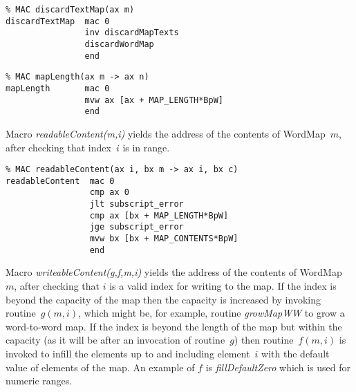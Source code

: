 {\small
\begin{verbatim}
% MAC discardTextMap(ax m)
discardTextMap  mac 0
                inv discardMapTexts
                discardWordMap
                end
\end{verbatim}}

\begin{tabbing}
\indents
{}
\end{tabbing}
\vspace{-17pt}

{\small
\begin{verbatim}
% MAC mapLength(ax m -> ax n)
mapLength       mac 0
                mvw ax [ax + MAP_LENGTH*BpW]
                end
\end{verbatim}}

Macro \emph{readableContent(m,i)} yields the address of the contents of WordMap~$m$, after checking that index~$i$ is in range.
\begin{tabbing}
\indents
{}
\fin
\end{tabbing}

{\small
\begin{verbatim}
% MAC readableContent(ax i, bx m -> ax i, bx c)
readableContent  mac 0
                 cmp ax 0
                 jlt subscript_error
                 cmp ax [bx + MAP_LENGTH*BpW]
                 jge subscript_error
                 mvw bx [bx + MAP_CONTENTS*BpW]
                 end
\end{verbatim}}

Macro \emph{writeableContent(g,f,m,i)} yields the address of the contents of WordMap~$m$, after checking that $i$ is a valid index for writing to the map. If the index is beyond the capacity of the map then the capacity is increased by invoking routine~$g(m,i)$, which might be, for example, routine \emph{growMapWW} to grow a word-to-word map. If the index is beyond the length of the map but within the capacity (as it will be after an invocation of routine~$g$) then routine~$f(m,i)$ is invoked to infill the elements up to and including element~$i$ with the default value of elements of the map.
An example of $f$ is \emph{fillDefaultZero} which is used for numeric ranges.
\begin{tabbing}
\indents
{}
\fin
\end{tabbing}

